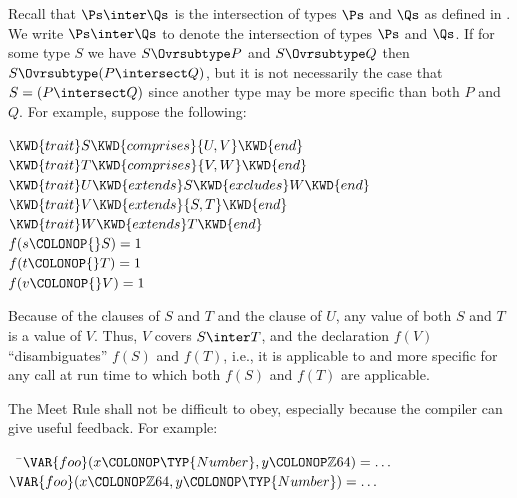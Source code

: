 Recall that $\Ps \inter \Qs$ is the intersection of types $\Ps$ and $\Qs$
as defined in .
We write $\Ps \inter \Qs$ to denote the intersection of types $\Ps$ and $\Qs$.
If for some type $S$ we have $S \Ovrsubtype P$ and $S \Ovrsubtype Q$ then
$S \Ovrsubtype (P \intersect Q)$, but it is not necessarily the
case that $S = (P \intersect Q)$ since another type may be more
specific than both $P$ and $Q$.
\label{adv-over-comprises}
For example, suppose the following:
%
\begin{Fortress}
\(\KWD{trait} S \KWD{comprises} \{U,V\} \KWD{end}\)\\
\(\KWD{trait} T \KWD{comprises} \{V,W\} \KWD{end}\)\\
\(\KWD{trait} U \KWD{extends} S \KWD{excludes} W \KWD{end}\)\\
\(\KWD{trait} V \KWD{extends} \{S,T\} \KWD{end}\)\\
\(\KWD{trait} W \KWD{extends} T \KWD{end}\)\\[4pt]
\(f(s\COLONOP{}S) = 1\)\\
\(f(t\COLONOP{}T) = 1\)\\
\(f(v\COLONOP{}V) = 1\)
\end{Fortress}
Because of the  clauses of $S$ and $T$ and the 
clause of $U$, any value of both $S$ and $T$ is a value of
$V$.  Thus, $V$ covers $S \inter T$, and the declaration $f(V)$
``disambiguates'' $f(S)$ and $f(T)$, i.e., it is applicable to and more
specific for any call at run time to which both $f(S)$ and $f(T)$ are
applicable.

The Meet Rule shall not be difficult to obey, especially because
the compiler can give useful feedback.  For example:

\begin{Fortress}
{\tt~~}\pushtabs\=\+\(  \VAR{foo}(x\COLONOP\TYP{Number}, y\COLONOP\mathbb{Z}64) = \ldots\)\\
\(  \VAR{foo}(x\COLONOP\mathbb{Z}64, y\COLONOP\TYP{Number}) = \ldots\)\-\\\poptabs
\end{Fortress}

